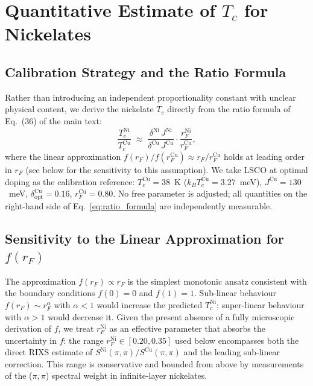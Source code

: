 \section{Quantitative Estimate of $T_c$ for Nickelates}
  \label{app:nickelate_Tc}

  \subsection{Calibration Strategy and the Ratio Formula}
    \label{subsec:calibration-strategy-and-the-ratio-formula}

    Rather than introducing an independent proportionality constant with unclear physical content,
    we derive the nickelate $T_c$ directly from the ratio formula of Eq.~(36) of the main text:
    \begin{equation}
      \frac{T_c^\textrm{Ni}}{T_c^\textrm{Cu}}
      \;\approx\;
      \frac{\delta^\textrm{Ni}\,J^\textrm{Ni}}{\delta^\textrm{Cu}\,J^\textrm{Cu}}
      \cdot
      \frac{r_F^\textrm{Ni}}{r_F^\textrm{Cu}},
      \label{eq:ratio_formula}
    \end{equation}
    where the linear approximation $f(r_F)/f(r_F^\textrm{Cu}) \approx r_F/r_F^\textrm{Cu}$ holds at
    leading order in $r_F$ (see below for the sensitivity to this assumption).
    We take LSCO at optimal doping as the calibration reference:
    $T_c^\textrm{Cu} = 38$~K ($k_BT_c^\textrm{Cu} = 3.27$~meV), $J^\textrm{Cu} = 130$~meV,
    $\delta^\textrm{Cu}_\textrm{opt} = 0.16$, $r_F^\textrm{Cu} = 0.80$.
    No free parameter is adjusted; all quantities on the right-hand side of
    Eq.~\eqref{eq:ratio_formula} are independently measurable.

  \subsection{Sensitivity to the Linear Approximation for $f(r_F)$}
    \label{subsec:sensitivity-to-the-linear-approximation-for-$f(r_f)$}

    The approximation $f(r_F) \propto r_F$ is the simplest monotonic ansatz consistent with the
    boundary conditions $f(0) = 0$ and $f(1) = 1$.
    Sub-linear behaviour $f(r_F) \sim r_F^\alpha$ with $\alpha < 1$ would increase the predicted
    $T_c^\textrm{Ni}$; super-linear behaviour with $\alpha > 1$ would decrease it.
    Given the present absence of a fully microscopic derivation of $f$, we treat $r_F^\textrm{Ni}$ as
    an effective parameter that absorbs the uncertainty in $f$: the range
    $r_F^\textrm{Ni} \in [0.20, 0.35]$ used below encompasses both the direct RIXS estimate of
    $S^\textrm{Ni}(\pi,\pi)/S^\textrm{Cu}(\pi,\pi)$ and the leading sub-linear correction.
    This range is conservative and bounded from above by measurements of the ($ \pi, \pi$) spectral
    weight in infinite-layer nickelates.

